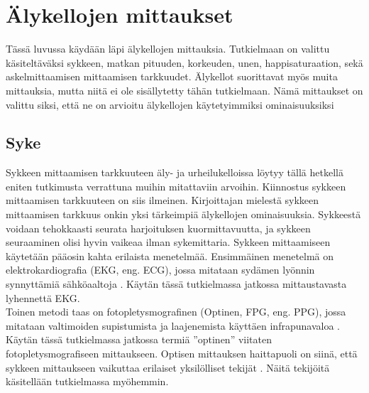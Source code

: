 \documentclass[utf8,bachelor,finnish]{bachelor}
\begin{document}
  \chapter{Älykellojen mittaukset}
  Tässä luvussa käydään läpi älykellojen mittauksia. Tutkielmaan on valittu käsiteltäväksi sykkeen, matkan pituuden, korkeuden, unen, happisaturaation, sekä askelmittaamisen mittaamisen tarkkuudet.
   Älykellot suorittavat myös muita mittauksia, mutta niitä ei ole sisällytetty tähän tutkielmaan. Nämä mittaukset on valittu siksi, että ne on arvioitu
    älykellojen käytetyimmiksi ominaisuuksiksi\\


  \section{Syke}
  Sykkeen mittaamisen tarkkuuteen äly- ja urheilukelloissa löytyy tällä hetkellä eniten tutkimusta verrattuna muihin mitattaviin arvoihin.
   Kiinnostus sykkeen mittaamisen tarkkuuteen on siis ilmeinen. Kirjoittajan mielestä sykkeen mittaamisen tarkkuus onkin yksi tärkeimpiä älykellojen ominaisuuksia.
    Sykkeestä voidaan tehokkaasti seurata harjoituksen kuormittavuutta, ja sykkeen seuraaminen olisi hyvin vaikeaa ilman sykemittaria.
     Sykkeen mittaamiseen käytetään pääosin kahta erilaista menetelmää. Ensimmäinen menetelmä on elektrokardiografia (EKG, eng. ECG), jossa mitataan sydämen lyönnin
      synnyttämiä sähköaaltoja \parencite{noauthor_heart_nodate}. Käytän tässä tutkielmassa jatkossa mittaustavasta lyhennettä EKG.\\

       Toinen metodi taas on fotopletysmografinen (Optinen, FPG, eng. PPG), jossa mitataan valtimoiden supistumista ja laajenemista käyttäen infrapunavaloa \parencite{noauthor_heart_nodate}.
        Käytän tässä tutkielmassa jatkossa termiä ''optinen'' viitaten fotopletysmografiseen
         mittaukseen. Optisen mittauksen haittapuoli on siinä, että sykkeen mittaukseen vaikuttaa erilaiset yksilölliset tekijät \parencite{koerber_accuracy_2022}.
          Näitä tekijöitä käsitellään tutkielmassa myöhemmin.
      
\end{document}
